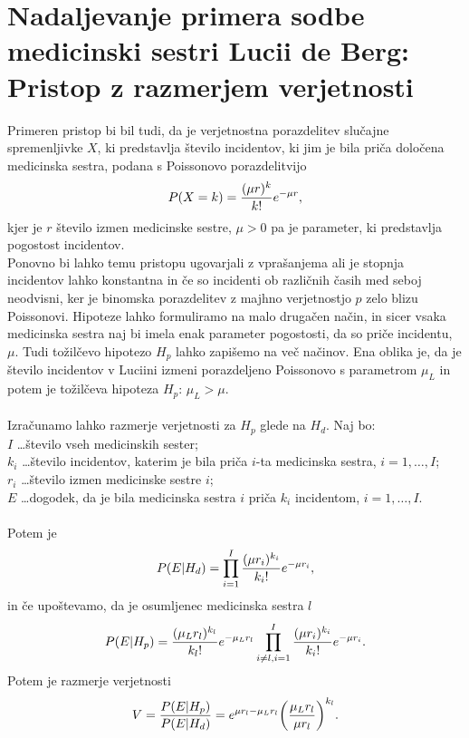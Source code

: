 \documentclass[12pt,a4paper]{amsart}
\theoremstyle{definition} %
\theoremstyle{plain} %
\begin{document}
\section{Nadaljevanje primera sodbe medicinski sestri Lucii de Berg: Pristop z razmerjem verjetnosti}
Primeren pristop bi bil tudi, da je verjetnostna porazdelitev slučajne spremenljivke $X$, ki predstavlja število incidentov, ki jim je bila priča 
določena medicinska sestra, podana s Poissonovo porazdelitvijo
\[
    P(X=k) = \frac{(\mu r)^{k}}{k!}e^{-\mu r}, \vspace{2mm}
\]
kjer je $r$ število izmen medicinske sestre, $\mu > 0$ pa je parameter, ki predstavlja pogostost incidentov.\\
Ponovno bi lahko temu pristopu ugovarjali z vprašanjema ali je stopnja incidentov lahko konstantna in če so incidenti ob različnih časih med seboj neodvisni, ker 
je binomska porazdelitev z majhno verjetnostjo $p$ zelo blizu Poissonovi. Hipoteze lahko formuliramo na malo drugačen način, in sicer vsaka medicinska sestra naj bi imela 
enak parameter pogostosti, da so priče incidentu, $\mu$. Tudi tožilčevo hipotezo $H_p$ lahko zapišemo na več načinov. Ena oblika je, da je število incidentov v Luciini izmeni 
porazdeljeno Poissonovo s parametrom $\mu _L$ in potem je tožilčeva hipoteza $H_p$: $\mu _L > \mu$.\\\\
Izračunamo lahko razmerje verjetnosti za $H_p$ glede na $H_d$. Naj bo:\\
$I$ \dots število vseh medicinskih sester;\\
$k_i$ \dots število incidentov, katerim je bila priča $i$-ta medicinska sestra, $i = 1, \dots , I$;\\
$r_i$ \dots število izmen medicinske sestre $i$;\\
$E$ \dots dogodek, da je bila medicinska sestra $i$ priča $k_i$ incidentom, $i = 1, \dots , I$.\\\\
Potem je
\[
    P(E \lvert H_d) = \prod_{i=1}^{I} \frac{(\mu r_i)^{k_i}}{k_i!}e^{-\mu r_i},\vspace{2mm}
\]
in če upoštevamo, da je osumljenec medicinska sestra $l$
\[
    \vspace{2mm}
    P(E \lvert H_p) = \frac{(\mu _L r_l)^{k_l}}{k_l!}e^{-\mu _L r_l}\prod_{i \neq l, i=1}^{I} \frac{(\mu r_i)^{k_i}}{k_i!}e^{-\mu r_i}.\vspace{2mm}
\]
Potem je razmerje verjetnosti
\begin{equation}\label{eq:rv}
    V = \frac{P(E \lvert H_p)}{P(E \lvert H_d)} = e^{\mu r_l-\mu _L r_l}\biggl(\frac{\mu _L r_l}{\mu r_l}\biggr)^{k_l}.\vspace{2mm}
\end{equation}
\end{document}
